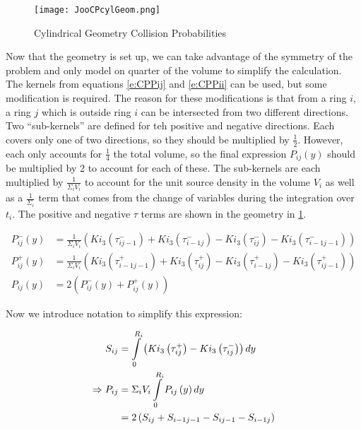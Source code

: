\begin{figure}
  \centering
  \texttt{[image: JooCPcylGeom.png]}
  \caption{Cylindrical Geometry Collision Probabilities \cite{NERS561CPNotes}}\label{f:CPcylGeom}
\end{figure}

Now that the geometry is set up, we can take advantage of the symmetry of the problem and only model on quarter of the volume to simplify the calculation.  The kernels from equations \ref{e:CPPij} and \ref{e:CPPii} can be used, but some modification is required.  The reason for these modifications is that from a ring $i$, a ring $j$ which is outside ring $i$ can be intersected from two different directions.  Two ``sub-kernels'' are defined for teh positive and negative directions.  Each covers only one of two directions, so they should be multiplied by $\frac{1}{2}$.  However, each only accounts for $\frac{1}{4}$ the total volume, so the final expression $P_{ij}\left(y\right)$ should be multiplied by 2 to account for each of these.  The sub-kernels are each multiplied by $\frac{1}{\Sigma_i V_i}$ to account for the unit source density in the volume $V_i$ as well as a $\frac{1}{\Sigma_i}$ term that comes from the change of variables during the integration over $t_i$.  The positive and negative $\tau$ terms are shown in the geometry in \ref{f:CPcylGeom}.

\begin{subequations}\label{e:CPcylPij(y)}
  \begin{align}
  P_{ij}^-\left(y\right) &= \frac{1}{\Sigma_i V_i} \left(Ki_3\left(\tau_{ij-1}^-\right) + Ki_3\left(\tau_{i-1j}^-\right) - Ki_3\left(\tau_{ij}^-\right) - Ki_3\left(\tau_{i-1j-1}^-\right)\right) \\
  P_{ij}^+\left(y\right) &= \frac{1}{\Sigma_i V_i} \left(Ki_3\left(\tau_{i-1j-1}^+\right) + Ki_3\left(\tau_{ij}^+\right) - Ki_3\left(\tau_{i-1j}^+\right) - Ki_3\left(\tau_{ij-1}^+\right)\right) \\
  P_{ij}\left(y\right) &= 2\left(P_{ij}^-\left(y\right) + P_{ij}^+\left(y\right)\right)
  \end{align}
\end{subequations}

Now we introduce notation to simplify this expression:

\begin{subequations}\label{e:CPcypPij}
  \begin{align}
  S_{ij} &= \intop_0^{R_i} \left(Ki_3\left(\tau_{ij}^+\right) - Ki_3\left(\tau_{ij}^-\right)\right)dy \\
  \Rightarrow P_{ij} &= \Sigma_i V_i \intop_0^{R_i} P_{ij}\left(y\right)dy \nonumber \\
  &= 2\left(S_{ij} + S_{i-1j-1} - S_{ij-1} - S_{i-1j}\right)
  \end{align}
\end{subequations}

